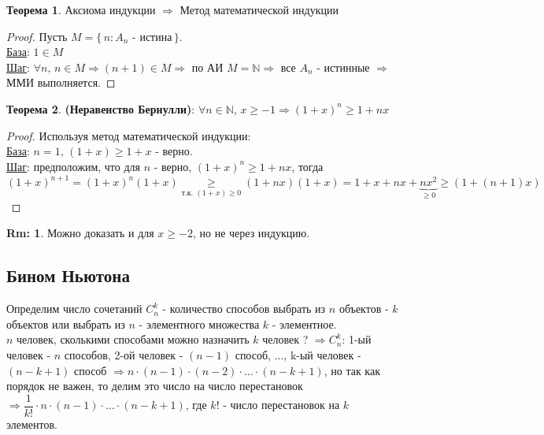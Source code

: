 \documentclass[12pt]{article}
\theoremstyle{definition}
\newtheorem{rem}{Rm:}
\newtheorem{theorem}{Теорема}
\begin{document}
\begin{theorem}
	Аксиома индукции $\Rightarrow$ Метод математической индукции
\end{theorem}
\begin{proof}
	Пусть $M = \{\,n \colon A_n \text{ - истина}\,\}$. \\
	\uline{База}: $1 \in M$\\
	\uline{Шаг}: $\forall n,\, n \in M \Rightarrow (n+1) \in M \Rightarrow$ по АИ $M = \mathbb{N} \Rightarrow$ все $A_n$ - истинные $\Rightarrow$ ММИ выполняется. 
\end{proof}

\begin{theorem}
	\textbf{(Неравенство Бернулли)}: $\forall n \in \mathbb{N}$, $x \geq -1 \Rightarrow (1+x)^n \geq 1 + nx$
\end{theorem}

\begin{proof}
	Используя метод математической индукции:\\
	\uline{База}: $n = 1,\, (1+x) \geq 1 + x$ - верно.\\
	\uline{Шаг}: предположим, что для $n$ - верно, $(1 + x)^n \geq 1 + nx$, тогда\\
	
	$(1+x)^{n+1} = (1+x)^n(1+x) \underset{\text{т.к. } (1+x)\geq 0}{\geq} (1 + nx)(1 + x) = 1 + x + nx + \underbrace{nx^2}_{\geq 0} \geq (1 + (n+1)x)$
\end{proof}

\begin{rem}
	Можно доказать и для $x \geq -2$, но не через индукцию.
\end{rem}

\subsection*{Бином Ньютона}

Определим число сочетаний $C_n^k$ - количество способов выбрать из $n$ объектов - $k$ объектов или выбрать из $n$ - элементного множества $k$ - элементное.\\
$n$ человек, сколькими способами можно назначить $k$ человек ? $\Rightarrow C_n^k$: 1-ый человек - $n$ способов, 2-ой человек - $(n-1)$ способ, $\dotsc$, k-ый человек - $(n-k+1)$ способ $\Rightarrow n\cdot  (n-1) \cdot (n-2) \cdot \dotsc \cdot (n-k+1)$, но так как порядок не важен, то делим это число на число перестановок $\Rightarrow \dfrac{1}{k!}\cdot n\cdot(n-1)\cdot\dotsc\cdot(n-k+1)$, где $k!$ - число перестановок на $k$ элементов.
\end{document}
